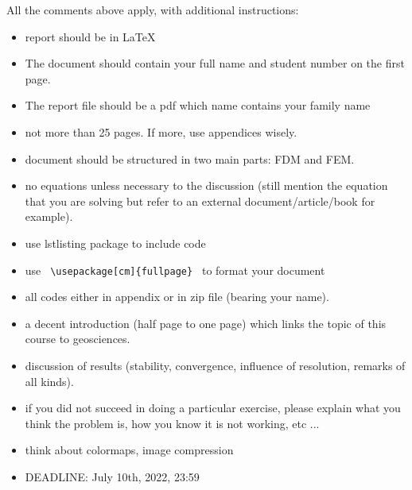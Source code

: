 All the comments above apply, with additional instructions:
\begin{itemize}
\item report should be in \LaTeX 
\item The document should contain your full name and student number on the first page. 
\item The report file should be a pdf which name contains your family name
\item not more than 25 pages. If more, use appendices wisely.
\item document should be structured in two main parts: FDM and FEM.
\item no equations unless necessary to the discussion (still mention the equation that 
you are solving but refer to an external document/article/book for example).
\item use lstlisting package to include code
\item use {\verb| \usepackage[cm]{fullpage} |} to format your document
\item all codes either in appendix or in zip file (bearing your name).
\item a decent introduction (half page to one page) which links the topic of this course to geosciences.
\item discussion of results (stability, convergence, influence of resolution, remarks of all kinds).
\item if you did not succeed in doing a particular exercise, please explain what you think the problem is, 
how you know it is not working, etc ...
\item think about colormaps, image compression
\item DEADLINE: July 10th, 2022, 23:59 
\end{itemize}









